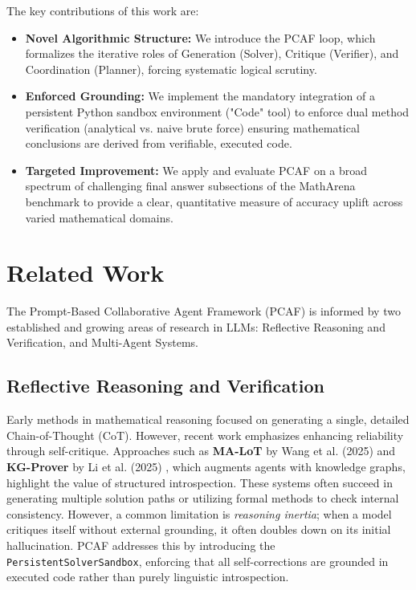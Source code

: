 \documentclass{article}
\begin{document}
The key contributions of this work are:
\begin{itemize}
    \item \textbf{Novel Algorithmic Structure:} We introduce the PCAF loop, which formalizes the iterative roles of Generation (Solver), Critique (Verifier), and Coordination (Planner), forcing systematic logical scrutiny.
    \item \textbf{Enforced Grounding:} We implement the mandatory integration of a persistent Python sandbox environment ("Code" tool) to enforce dual method verification (analytical vs. naive brute force) ensuring mathematical conclusions are derived from verifiable, executed code.
    \item \textbf{Targeted Improvement:} We apply and evaluate PCAF on a broad spectrum of challenging final answer subsections of the MathArena benchmark to provide a clear, quantitative measure of accuracy uplift across varied mathematical domains.
\end{itemize}

\section{Related Work}
The Prompt-Based Collaborative Agent Framework (PCAF) is informed by two established and growing areas of research in LLMs: Reflective Reasoning and Verification, and Multi-Agent Systems.

\subsection{Reflective Reasoning and Verification}
Early methods in mathematical reasoning focused on generating a single, detailed Chain-of-Thought (CoT). However, recent work emphasizes enhancing reliability through self-critique. Approaches such as \textbf{MA-LoT} by Wang et al. (2025) \cite{Wang2025MALoT} and \textbf{KG-Prover} by Li et al. (2025) \cite{Li2025AutomatingProofs}, which augments agents with knowledge graphs, highlight the value of structured introspection. These systems often succeed in generating multiple solution paths or utilizing formal methods to check internal consistency.
However, a common limitation is \textit{reasoning inertia}; when a model critiques itself without external grounding, it often doubles down on its initial hallucination. 
PCAF addresses this by introducing the \texttt{PersistentSolverSandbox}, enforcing that all self-corrections are grounded in executed code rather than purely linguistic introspection.
\end{document}
